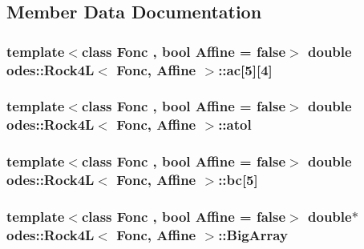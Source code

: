 \subsection{Member Data Documentation}
\hypertarget{classodes_1_1Rock4L_a595b343bc1e9480a638b300c2ca20925}{
\subsubsection[{ac}]{\setlength{\rightskip}{0pt plus 5cm}template$<$class Fonc , bool Affine = false$>$ double {\bf odes\-::\-Rock4\-L}$<$ Fonc, Affine $>$\-::ac\mbox{[}5\mbox{]}\mbox{[}4\mbox{]}\hspace{0.3cm}{\ttfamily [private]}}}\label{classodes_1_1Rock4L_a595b343bc1e9480a638b300c2ca20925}
\hypertarget{classodes_1_1Rock4L_ae411684888f3342a131797bce0cad7d7}{
\subsubsection[{atol}]{\setlength{\rightskip}{0pt plus 5cm}template$<$class Fonc , bool Affine = false$>$ double {\bf odes\-::\-Rock4\-L}$<$ Fonc, Affine $>$\-::atol\hspace{0.3cm}{\ttfamily [private]}}}\label{classodes_1_1Rock4L_ae411684888f3342a131797bce0cad7d7}
\hypertarget{classodes_1_1Rock4L_a8b986b860f8fc7d8481524726c984f5c}{
\subsubsection[{bc}]{\setlength{\rightskip}{0pt plus 5cm}template$<$class Fonc , bool Affine = false$>$ double {\bf odes\-::\-Rock4\-L}$<$ Fonc, Affine $>$\-::bc\mbox{[}5\mbox{]}\hspace{0.3cm}{\ttfamily [private]}}}\label{classodes_1_1Rock4L_a8b986b860f8fc7d8481524726c984f5c}
\hypertarget{classodes_1_1Rock4L_a41d6a3f04401f593191a7f8031dff97c}{
\subsubsection[{Big\-Array}]{\setlength{\rightskip}{0pt plus 5cm}template$<$class Fonc , bool Affine = false$>$ double$\ast$ {\bf odes\-::\-Rock4\-L}$<$ Fonc, Affine $>$\-::Big\-Array\hspace{0.3cm}{\ttfamily [private]}}}\label{classodes_1_1Rock4L_a41d6a3f04401f593191a7f8031dff97c}
